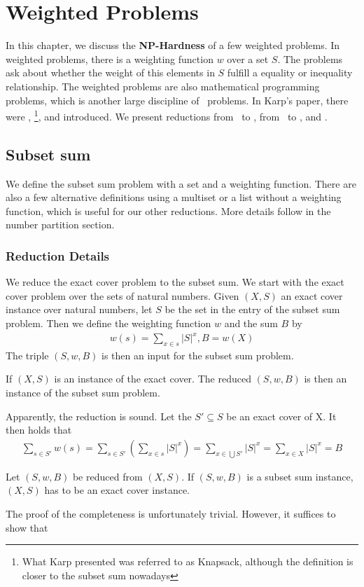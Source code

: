 \chapter{Weighted Problems}\label{chapter:weighted}
In this chapter, we discuss the \textbf{NP-Hardness} of a few weighted problems. In weighted problems, 
there is a weighting function $w$ over a set $S$. The problems ask about whether the weight of this elements 
in $S$ fulfill a equality or inequality relationship. The weighted problems are also mathematical programming 
problems, which is another large discipline of \NPH\ problems. In Karp's paper, there were \XC, \SBS \footnote{What Karp presented was referred to as Knapsack, although
the definition is closer to the subset sum nowadays}, and \KN introduced. 
We present reductions from \XC\ to \SBS, from \SBS\ to \Part, \KN and \IP. 

\section{Subset sum}
We define the subset sum problem with a set and a weighting function. There are also a few alternative definitions using a multiset or a list without 
a weighting function, which is useful for our other reductions. More details follow in the number partition section. 

\subsection{Reduction Details}
We reduce the exact cover problem to the subset sum. We start with the exact cover problem over the sets of natural numbers. 
Given $(X, S)$ an exact cover instance over natural numbers, let $S$ be the set in the entry of the subset sum problem. Then we
define the weighting function $w$ and the sum $B$ by 
\begin{align*}
    w(s) = \sum_{x \in s} |S|^x , B = w(X)
\end{align*}
The triple $(S, w, B)$ is then an input for the subset sum problem.
\begin{lemma}[Soundness]
    If $(X, S)$ is an instance of the exact cover. The reduced $(S, w, B)$ is then an instance of the subset sum problem. 
\end{lemma}
Apparently, the reduction is sound. Let the $S' \subseteq S$ be an exact cover of X. It then holds that
\begin{align*}
    \sum_{s \in S'} w(s) = \sum_{s \in S'} (\sum_{x \in s} |S|^x) = \sum_{x \in \bigcup S'} |S|^x = \sum_{x \in X} |S|^x = B
\end{align*}
\begin{lemma}[Completeness]
    Let $(S, w, B)$ be reduced from $(X, S)$. If $(S, w, B)$ is a subset sum instance, $(X, S)$ has to be an exact cover instance. 
\end{lemma}
The proof of the completeness is unfortunately trivial. However, it suffices to show that 

